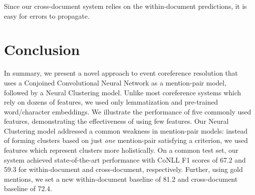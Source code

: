 \documentclass[11pt,a4paper]{article}
\begin{document}
Since our cross-document system relies on the within-document predictions, it is easy for errors to propagate.




\section{Conclusion}
In summary, we present a novel approach to event coreference resolution that uses a Conjoined Convolutional Neural Network as a mention-pair model, followed by a Neural Clustering model.  Unlike most coreference systems which rely on dozens of features, we used only lemmatization and pre-trained word/character embeddings.  We illustrate the performance of five commonly used features, demonstrating the effectiveness of using few features.  Our Neural Clustering model addressed a common weakness in mention-pair models: instead of forming clusters based on just \textit{one} mention-pair satisfying a criterion, we used features which represent clusters more holistically.  On a common test set, our system achieved state-of-the-art performance with CoNLL F1 scores of 67.2 and 59.3 for within-document and cross-document, respectively.  Further, using gold mentions, we set a new within-document baseline of 81.2 and cross-document baseline of 72.4.

%
%



\appendix
\end{document}
